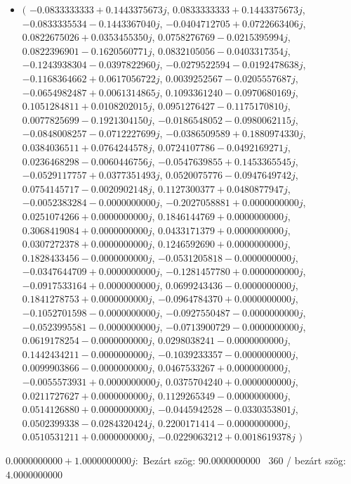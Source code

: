 \documentclass[14pt,a4paper]{article}
\begin{document}
\begin{itemize}
\item
$\big($
$-0.0833333333+0.1443375673j$, $0.0833333333+0.1443375673j$, $-0.0833335534-0.1443367040j$, $-0.0404712705+0.0722663406j$, $0.0822675026+0.0353455350j$, $0.0758276769-0.0215395994j$, $0.0822396901-0.1620560771j$, $0.0832105056-0.0403317354j$, $-0.1243938304-0.0397822960j$, $-0.0279522594-0.0192478638j$, $-0.1168364662+0.0617056722j$, $0.0039252567-0.0205557687j$, $-0.0654982487+0.0061314865j$, $0.1093361240-0.0970680169j$, $0.1051284811+0.0108202015j$, $0.0951276427-0.1175170810j$, $0.0077825699-0.1921304150j$, $-0.0186548052-0.0980062115j$, $-0.0848008257-0.0712227699j$, $-0.0386509589+0.1880974330j$, $0.0384036511+0.0764244578j$, $0.0724107786-0.0492169271j$, $0.0236468298-0.0060446756j$, $-0.0547639855+0.1453365545j$, $-0.0529117757+0.0377351493j$, $0.0520075776-0.0947649742j$, $0.0754145717-0.0020902148j$, $0.1127300377+0.0480877947j$, $-0.0052383284-0.0000000000j$, $-0.2027058881+0.0000000000j$, $0.0251074266+0.0000000000j$, $0.1846144769+0.0000000000j$, $0.3068419084+0.0000000000j$, $0.0433171379+0.0000000000j$, $0.0307272378+0.0000000000j$, $0.1246592690+0.0000000000j$, $0.1828433456-0.0000000000j$, $-0.0531205818-0.0000000000j$, $-0.0347644709+0.0000000000j$, $-0.1281457780+0.0000000000j$, $-0.0917533164+0.0000000000j$, $0.0699243436-0.0000000000j$, $0.1841278753+0.0000000000j$, $-0.0964784370+0.0000000000j$, $-0.1052701598-0.0000000000j$, $-0.0927550487-0.0000000000j$, $-0.0523995581-0.0000000000j$, $-0.0713900729-0.0000000000j$, $0.0619178254-0.0000000000j$, $0.0298038241-0.0000000000j$, $0.1442434211-0.0000000000j$, $-0.1039233357-0.0000000000j$, $0.0099903866-0.0000000000j$, $0.0467533267+0.0000000000j$, $-0.0055573931+0.0000000000j$, $0.0375704240+0.0000000000j$, $0.0211727627+0.0000000000j$, $0.1129265349-0.0000000000j$, $0.0514126880+0.0000000000j$, $-0.0445942528-0.0330353801j$, $0.0502399338-0.0284320424j$, $0.2200171414-0.0000000000j$, $0.0510531211+0.0000000000j$, $-0.0229063212+0.0018619378j$
$\big)$
\end{itemize}
$0.0000000000+1.0000000000j$:\
Bezárt szög: $90.0000000000$ \
360 / bezárt szög: $4.0000000000$\
\end{document}
